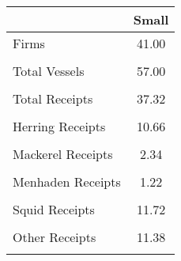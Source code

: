 \begin{tabular}{l*{1}{c}}
\hline\hline
                &    Small\\
\hline
Firms           &    41.00\\
                &         \\
Total Vessels   &    57.00\\
                &         \\
Total Receipts  &    37.32\\
                &         \\
Herring Receipts&    10.66\\
                &         \\
Mackerel Receipts&     2.34\\
                &         \\
Menhaden Receipts&     1.22\\
                &         \\
Squid Receipts  &    11.72\\
                &         \\
Other Receipts  &    11.38\\
                &         \\
\hline\hline
\end{tabular}
